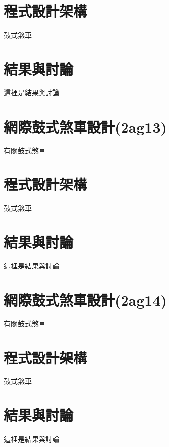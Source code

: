 \documentclass[]{article}
\begin{document}
\section{程式設計架構}\label{ux7a0bux5f0fux8a2dux8a08ux67b6ux69cb-8}

鼓式煞車

\section{結果與討論}\label{ux7d50ux679cux8207ux8a0eux8ad6-9}

這裡是結果與討論

\section{網際鼓式煞車設計(2ag13)}\label{ux7db2ux969bux9f13ux5f0fux715eux8ecaux8a2dux8a082ag13}

有關鼓式煞車

\section{程式設計架構}\label{ux7a0bux5f0fux8a2dux8a08ux67b6ux69cb-9}

鼓式煞車

\section{結果與討論}\label{ux7d50ux679cux8207ux8a0eux8ad6-10}

這裡是結果與討論

\section{網際鼓式煞車設計(2ag14)}\label{ux7db2ux969bux9f13ux5f0fux715eux8ecaux8a2dux8a082ag14}

有關鼓式煞車

\section{程式設計架構}\label{ux7a0bux5f0fux8a2dux8a08ux67b6ux69cb-10}

鼓式煞車

\section{結果與討論}\label{ux7d50ux679cux8207ux8a0eux8ad6-11}

這裡是結果與討論
\end{document}
